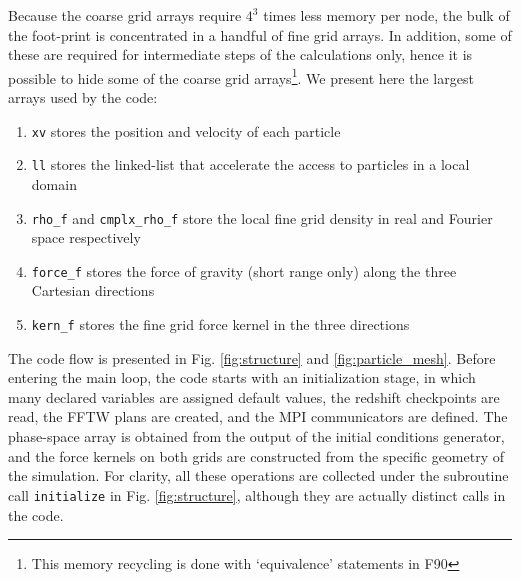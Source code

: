 
Because the coarse grid arrays require $4^3$ times less memory per node, 
the bulk of the foot-print is concentrated in a handful of fine grid arrays.
In addition, some of these are required for intermediate steps of the calculations only, 
hence it is possible to hide some of the coarse grid arrays\footnote{ This memory recycling is done with `equivalence' statements in {\small F90}}.   
We present here the largest arrays used by the code:
\begin{enumerate}
\item{{\tt xv} stores the position and velocity of each particle} 
\item{{\tt ll} stores the linked-list that accelerate the access to particles in a local domain}
\item{{\tt rho\_f} and {\tt cmplx\_rho\_f} store 
the local fine grid density  in real and Fourier space respectively}
\item{{\tt force\_f} stores the force of gravity (short range only) along the three Cartesian directions}
\item{{\tt kern\_f} stores the fine grid force kernel in the three directions}
\end{enumerate}


The code flow is presented in Fig. \ref{fig:structure} and \ref{fig:particle_mesh}.
Before entering the main loop, the code starts with an initialization stage, 
in which many declared variables are assigned default values,
the redshift checkpoints are read, the {\small FFTW} plans are created, and the {\small MPI} communicators are defined.
The phase-space array  is obtained from the output of the initial conditions generator,
and the force kernels on both grids are constructed from the specific geometry of the simulation.
For clarity, all these operations are collected under the subroutine call {\tt initialize} in Fig. \ref{fig:structure}, 
although they are actually distinct calls in the code.

